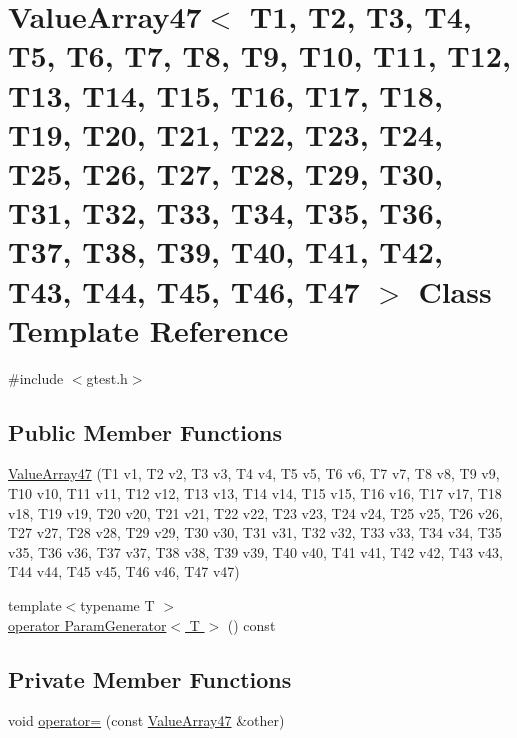 \hypertarget{classtesting_1_1internal_1_1ValueArray47}{\section{\-Value\-Array47$<$ \-T1, \-T2, \-T3, \-T4, \-T5, \-T6, \-T7, \-T8, \-T9, \-T10, \-T11, \-T12, \-T13, \-T14, \-T15, \-T16, \-T17, \-T18, \-T19, \-T20, \-T21, \-T22, \-T23, \-T24, \-T25, \-T26, \-T27, \-T28, \-T29, \-T30, \-T31, \-T32, \-T33, \-T34, \-T35, \-T36, \-T37, \-T38, \-T39, \-T40, \-T41, \-T42, \-T43, \-T44, \-T45, \-T46, \-T47 $>$ \-Class \-Template \-Reference}
\label{d6/d6c/classtesting_1_1internal_1_1ValueArray47}
}


{\ttfamily \#include $<$gtest.\-h$>$}

\subsection*{\-Public \-Member \-Functions}
\begin{DoxyCompactItemize}
\item 
\hyperlink{classtesting_1_1internal_1_1ValueArray47_a86b55bedd7ea775566cd91ce64e99255}{\-Value\-Array47} (\-T1 v1, \-T2 v2, \-T3 v3, \-T4 v4, \-T5 v5, \-T6 v6, \-T7 v7, \-T8 v8, \-T9 v9, \-T10 v10, \-T11 v11, \-T12 v12, \-T13 v13, \-T14 v14, \-T15 v15, \-T16 v16, \-T17 v17, \-T18 v18, \-T19 v19, \-T20 v20, \-T21 v21, \-T22 v22, \-T23 v23, \-T24 v24, \-T25 v25, \-T26 v26, \-T27 v27, \-T28 v28, \-T29 v29, \-T30 v30, \-T31 v31, \-T32 v32, \-T33 v33, \-T34 v34, \-T35 v35, \-T36 v36, \-T37 v37, \-T38 v38, \-T39 v39, \-T40 v40, \-T41 v41, \-T42 v42, \-T43 v43, \-T44 v44, \-T45 v45, \-T46 v46, \-T47 v47)
\item 
{\footnotesize template$<$typename T $>$ }\\\hyperlink{classtesting_1_1internal_1_1ValueArray47_a08ef46fa12c9dd8ef6fc630baeea89b7}{operator Param\-Generator$<$ T $>$} () const 
\end{DoxyCompactItemize}
\subsection*{\-Private \-Member \-Functions}
\begin{DoxyCompactItemize}
\item 
void \hyperlink{classtesting_1_1internal_1_1ValueArray47_a45dbd71c49a98f5b35d3197d0addf00f}{operator=} (const \hyperlink{classtesting_1_1internal_1_1ValueArray47}{\-Value\-Array47} \&other)
\end{DoxyCompactItemize}
